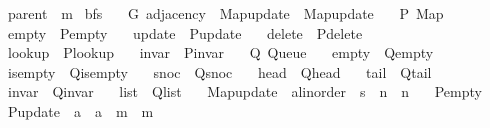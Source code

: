 \begin{isabellebody}
\ \ parent\ {\isacharcolon}{\kern0pt}{\isacharcolon}{\kern0pt}\ {\isachardoublequoteopen}{\isacharprime}{\kern0pt}m{\isachardoublequoteclose}\isanewline
\isanewline
{}\isamarkupfalse%
\ bfs\ {\isacharequal}{\kern0pt}\isanewline
\ \ G{\isacharcolon}{\kern0pt}\ adjacency\ \ Map{\isacharunderscore}{\kern0pt}update\ {\isacharequal}{\kern0pt}\ Map{\isacharunderscore}{\kern0pt}update\ {\isacharplus}{\kern0pt}\isanewline
\ \ P{\isacharcolon}{\kern0pt}\ Map\ \isanewline
\ \ empty\ {\isacharequal}{\kern0pt}\ P{\isacharunderscore}{\kern0pt}empty\ \isanewline
\ \ update\ {\isacharequal}{\kern0pt}\ P{\isacharunderscore}{\kern0pt}update\ \isanewline
\ \ delete\ {\isacharequal}{\kern0pt}\ P{\isacharunderscore}{\kern0pt}delete\ \isanewline
\ \ lookup\ {\isacharequal}{\kern0pt}\ P{\isacharunderscore}{\kern0pt}lookup\ \isanewline
\ \ invar\ {\isacharequal}{\kern0pt}\ P{\isacharunderscore}{\kern0pt}invar\ {\isacharplus}{\kern0pt}\isanewline
\ \ Q{\isacharcolon}{\kern0pt}\ Queue\ \isanewline
\ \ empty\ {\isacharequal}{\kern0pt}\ Q{\isacharunderscore}{\kern0pt}empty\ \isanewline
\ \ is{\isacharunderscore}{\kern0pt}empty\ {\isacharequal}{\kern0pt}\ Q{\isacharunderscore}{\kern0pt}is{\isacharunderscore}{\kern0pt}empty\ \isanewline
\ \ snoc\ {\isacharequal}{\kern0pt}\ Q{\isacharunderscore}{\kern0pt}snoc\ \isanewline
\ \ head\ {\isacharequal}{\kern0pt}\ Q{\isacharunderscore}{\kern0pt}head\ \isanewline
\ \ tail\ {\isacharequal}{\kern0pt}\ Q{\isacharunderscore}{\kern0pt}tail\ \isanewline
\ \ invar\ {\isacharequal}{\kern0pt}\ Q{\isacharunderscore}{\kern0pt}invar\ \isanewline
\ \ list\ {\isacharequal}{\kern0pt}\ Q{\isacharunderscore}{\kern0pt}list\ \isanewline
\ \ Map{\isacharunderscore}{\kern0pt}update\ {\isacharcolon}{\kern0pt}{\isacharcolon}{\kern0pt}\ {\isachardoublequoteopen}{\isacharprime}{\kern0pt}a{\isacharcolon}{\kern0pt}{\isacharcolon}{\kern0pt}linorder\ {\isasymRightarrow}\ {\isacharprime}{\kern0pt}s\ {\isasymRightarrow}\ {\isacharprime}{\kern0pt}n\ {\isasymRightarrow}\ {\isacharprime}{\kern0pt}n{\isachardoublequoteclose}\ \isanewline
\ \ P{\isacharunderscore}{\kern0pt}empty\ \isanewline
\ \ P{\isacharunderscore}{\kern0pt}update\ {\isacharcolon}{\kern0pt}{\isacharcolon}{\kern0pt}\ {\isachardoublequoteopen}{\isacharprime}{\kern0pt}a\ {\isasymRightarrow}\ {\isacharprime}{\kern0pt}a\ {\isasymRightarrow}\ {\isacharprime}{\kern0pt}m\ {\isasymRightarrow}\ {\isacharprime}{\kern0pt}m{\isachardoublequoteclose}\ \isanewline

\end{isabellebody}
